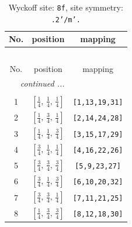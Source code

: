 \documentclass[fleqn,8pt]{jsarticle}
\begin{document}
\begin{longtable}{ccc}
\caption{Wyckoff site: {\tt 8f}, site symmetry: {\tt .2'/m'.}}
 \\
 \hline \hline
No. & position & mapping \\ \hline \endfirsthead

\multicolumn{2}{l}{\tablename\ \thetable{}} \\
 \hline \hline
No. & position & mapping \\ \hline \endhead

 \hline \hline
\multicolumn{2}{r}{\footnotesize\it continued ...} \\ \endfoot

 \hline \hline
\multicolumn{2}{r}{} \\ \endlastfoot

1 & $\left[ \frac{1}{4},\, \frac{1}{4},\, \frac{1}{4} \right]$ & {\tt [1,13,19,31]} \\ \hline
2 & $\left[ \frac{1}{4},\, \frac{3}{4},\, \frac{1}{4} \right]$ & {\tt [2,14,24,28]} \\ \hline
3 & $\left[ \frac{1}{4},\, \frac{1}{4},\, \frac{3}{4} \right]$ & {\tt [3,15,17,29]} \\ \hline
4 & $\left[ \frac{3}{4},\, \frac{1}{4},\, \frac{1}{4} \right]$ & {\tt [4,16,22,26]} \\ \hline
5 & $\left[ \frac{3}{4},\, \frac{3}{4},\, \frac{3}{4} \right]$ & {\tt [5,9,23,27]} \\ \hline
6 & $\left[ \frac{3}{4},\, \frac{1}{4},\, \frac{3}{4} \right]$ & {\tt [6,10,20,32]} \\ \hline
7 & $\left[ \frac{3}{4},\, \frac{3}{4},\, \frac{1}{4} \right]$ & {\tt [7,11,21,25]} \\ \hline
8 & $\left[ \frac{1}{4},\, \frac{3}{4},\, \frac{3}{4} \right]$ & {\tt [8,12,18,30]} \\
\end{longtable}
\renewcommand{\arraystretch}{1.2}
\end{document}
